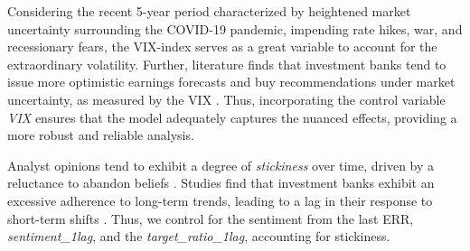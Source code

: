 
Considering the recent 5-year period characterized by heightened market uncertainty surrounding the COVID-19 pandemic, impending rate hikes, war, and recessionary fears, the VIX-index serves as a great variable to account for the extraordinary volatility. Further, literature finds that investment banks tend to issue more optimistic earnings forecasts and buy recommendations under market uncertainty, as measured by the VIX \parencite{chang2017analyst}. Thus, incorporating the control variable \textit{VIX} ensures that the model adequately captures the nuanced effects, providing a more robust and reliable analysis.

Analyst opinions tend to exhibit a degree of \textit{stickiness} over time, driven by a reluctance to abandon beliefs \parencite{bouchaud2019sticky}. Studies find that investment banks exhibit an excessive adherence to long-term trends, leading to a lag in their response to short-term shifts \parencite{filiz2021sticky}. Thus, we control for the sentiment from the last ERR, \textit{sentiment\_1lag}, and the \textit{target\_ratio\_1lag}, accounting for stickiness.%






